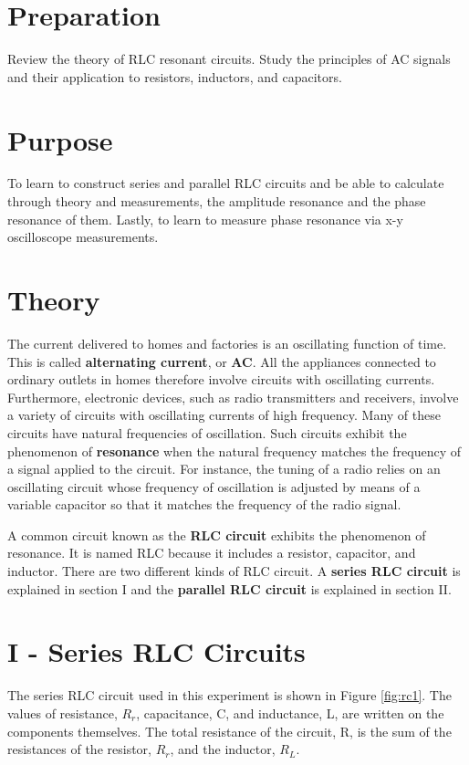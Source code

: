 \section{Preparation}
Review the theory of RLC resonant circuits. Study the principles of AC signals and their application to resistors, inductors, and capacitors. 

\section{Purpose}
To learn to construct series and parallel RLC circuits and be able to calculate through theory and measurements, the amplitude resonance and the phase resonance of them. Lastly, to learn to measure phase resonance via x-y oscilloscope measurements.

\section{Theory}
The current delivered to homes and factories is an oscillating function of time. This is called {\bf alternating current}, or {\bf AC}. All the appliances connected to ordinary outlets in homes therefore involve circuits with oscillating currents. Furthermore, electronic devices, such as radio transmitters and receivers, involve a variety of circuits with oscillating currents of high frequency. Many of these circuits have natural frequencies of oscillation. Such circuits exhibit the phenomenon of {\bf resonance} when the natural frequency matches the frequency of a signal applied to the circuit. For instance, the tuning of a radio relies on an oscillating circuit whose frequency of oscillation is adjusted by means of a variable capacitor so that it matches the frequency of the radio signal.

A common circuit known as the {\bf RLC circuit} exhibits the phenomenon of resonance. It is named RLC because it includes a resistor, capacitor, and inductor. There are two different kinds of RLC circuit. A {\bf series RLC circuit} is explained in section I and the {\bf parallel RLC circuit} is explained in section II.

\section{I - Series RLC Circuits}
The series RLC circuit used in this experiment is shown in Figure \ref{fig:rc1}. The values of resistance, $R_r$, capacitance, C, and inductance, L, are written on the components themselves. The total resistance of the circuit, R, is the sum of the resistances of the resistor, $R_r$, and the inductor, $R_L$.


